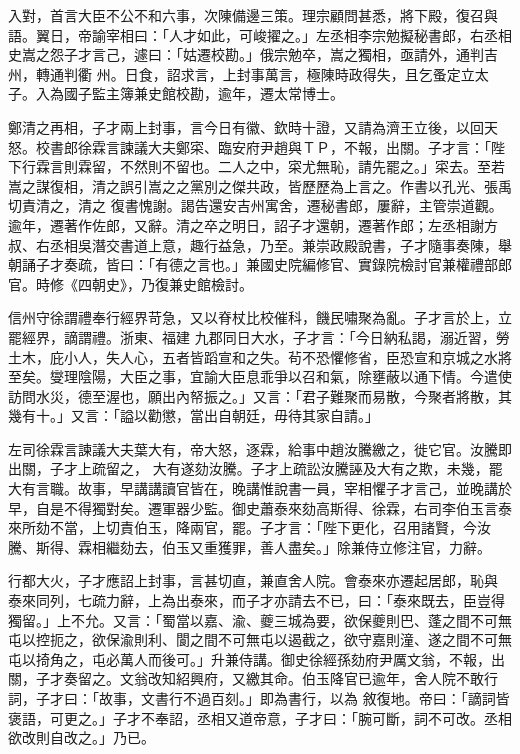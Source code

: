 \begin{pinyinscope}
 入對，首言大臣不公不和六事，次陳備邊三策。理宗顧問甚悉，將下殿，復召與語。翼日，帝諭宰相曰：「人才如此，可峻擢之。」左丞相李宗勉擬秘書郎，右丞相史嵩之怨子才言己，遽曰：「姑遷校勘。」俄宗勉卒，嵩之獨相，亟請外，通判吉州，轉通判衢
 州。日食，詔求言，上封事萬言，極陳時政得失，且乞蚤定立太子。入為國子監主簿兼史館校勘，逾年，遷太常博士。



 鄭清之再相，子才兩上封事，言今日有徽、欽時十證，又請為濟王立後，以回天怒。校書郎徐霖言諫議大夫鄭寀、臨安府尹趙與ＴＰ，不報，出關。子才言：「陛下行霖言則霖留，不然則不留也。二人之中，寀尤無恥，請先罷之。」寀去。至若嵩之謀復相，清之誤引嵩之之黨別之傑共政，皆歷歷為上言之。作書以孔光、張禹切責清之，清之
 復書愧謝。謁告還安吉州寓舍，遷秘書郎，屢辭，主管崇道觀。逾年，遷著作佐郎，又辭。清之卒之明日，詔子才還朝，遷著作郎；左丞相謝方叔、右丞相吳潛交書道上意，趣行益急，乃至。兼崇政殿說書，子才隨事奏陳，舉朝誦子才奏疏，皆曰：「有德之言也。」兼國史院編修官、實錄院檢討官兼權禮部郎官。時修《四朝史》，乃復兼史館檢討。



 信州守徐謂禮奉行經界苛急，又以脊杖比校催科，饑民嘯聚為亂。子才言於上，立罷經界，謫謂禮。浙東、福建
 九郡同日大水，子才言：「今日納私謁，溺近習，勞土木，庇小人，失人心，五者皆蹈宣和之失。茍不恐懼修省，臣恐宣和京城之水將至矣。燮理陰陽，大臣之事，宜諭大臣息乖爭以召和氣，除壅蔽以通下情。今遣使訪問水災，德至渥也，願出內帑振之。」又言：「君子難聚而易散，今聚者將散，其幾有十。」又言：「謚以勸懲，當出自朝廷，毋待其家自請。」



 左司徐霖言諫議大夫葉大有，帝大怒，逐霖，給事中趙汝騰繳之，徙它官。汝騰即出關，子才上疏留之，
 大有遂劾汝騰。子才上疏訟汝騰誣及大有之欺，未幾，罷大有言職。故事，早講講讀官皆在，晚講惟說書一員，宰相懼子才言己，並晚講於早，自是不得獨對矣。遷軍器少監。御史蕭泰來劾高斯得、徐霖，右司李伯玉言泰來所劾不當，上切責伯玉，降兩官，罷。子才言：「陛下更化，召用諸賢，今汝騰、斯得、霖相繼劾去，伯玉又重獲罪，善人盡矣。」除兼侍立修注官，力辭。



 行都大火，子才應詔上封事，言甚切直，兼直舍人院。會泰來亦遷起居郎，恥與
 泰來同列，七疏力辭，上為出泰來，而子才亦請去不已，曰：「泰來既去，臣豈得獨留。」上不允。又言：「蜀當以嘉、渝、夔三城為要，欲保夔則巴、蓬之間不可無屯以控扼之，欲保渝則利、閬之間不可無屯以遏截之，欲守嘉則潼、遂之間不可無屯以掎角之，屯必萬人而後可。」升兼侍講。御史徐經孫劾府尹厲文翁，不報，出關，子才奏留之。文翁改知紹興府，又繳其命。伯玉降官已逾年，舍人院不敢行詞，子才曰：「故事，文書行不過百刻。」即為書行，以為
 敘復地。帝曰：「謫詞皆褒語，可更之。」子才不奉詔，丞相又道帝意，子才曰：「腕可斷，詞不可改。丞相欲改則自改之。」乃已。




\end{pinyinscope}
